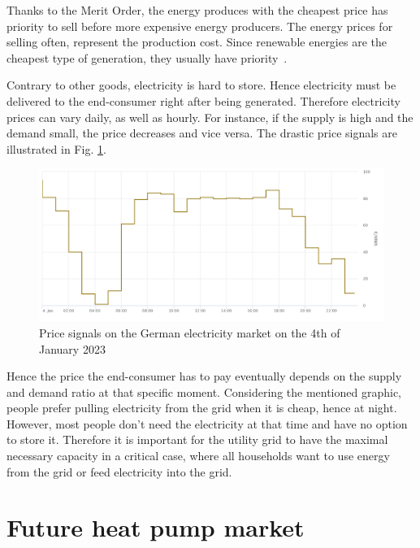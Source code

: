 Thanks to the Merit Order, the energy produces with the cheapest price has priority to sell before more expensive energy producers. The energy prices for selling often, represent the production cost. Since renewable energies are the cheapest type of generation, they usually have priority~\cite{Bundesnetzagentur}. 

Contrary to other goods, electricity is hard to store. Hence electricity must be delivered to the end-consumer right after being generated. Therefore electricity prices can vary daily, as well as hourly. For instance, if the supply is high and the demand small, the price decreases and vice versa. The drastic price signals are illustrated in Fig. \ref{fig:pricesignals}.

\begin{figure}[ht]
    \centering
    \includegraphics[scale=0.3]{thesis-latex/img/pricesignals.png}
    \caption{Price signals on the German electricity market on the 4th of January 2023~\cite{Bundesnetzagentur}}
    \label{fig:pricesignals}
\end{figure}

Hence the price the end-consumer has to pay eventually depends on the supply and demand ratio at that specific moment. Considering the mentioned graphic, people prefer pulling electricity from the grid when it is cheap, hence at night. However, most people don't need the electricity at that time and have no option to store it. Therefore it is important for the utility grid to have the maximal necessary capacity in a critical case, where all households want to use energy from the grid or feed electricity into the grid. 


\section{Future heat pump market}
\label{sec:markethp}

